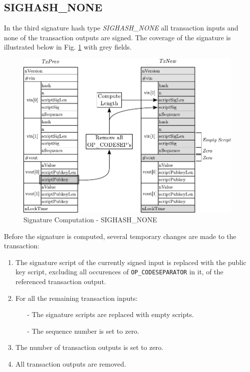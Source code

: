 \clearpage
\subsection*{SIGHASH\_NONE}
In the third signature hash type \emph{SIGHASH\_NONE} all transaction inputs and none of the transaction outputs are signed. The coverage of the signature is illustrated below in Fig. \ref{fig:SigHash-None} with grey fields.

\begin{figure}[ht!]
 \centering
 \includegraphics[scale=0.975]{Images/SIGHASH_NONE.pdf}
 \caption{Signature Computation - SIGHASH\_NONE} \label{fig:SigHash-None}
\end{figure}

\noindent
Before the signature is computed, several temporary changes are made to the transaction:
\begin{enumerate}[label=\alph*), leftmargin=1cm]
\item The signature script of the currently signed input is replaced with the public key script, excluding all occurences of \texttt{OP\_CODESEPARATOR} in it, of the referenced transaction output.
\item For all the remaining transaction inputs:\vspace{5pt}
\begin{itemize}
\item[-] The signature scripts are replaced with empty scripts.
\item[-] The sequence number is set to zero.
\end{itemize}
\item The number of transaction outputs is set to zero.
\item All transaction outputs are removed.
\end{enumerate}


